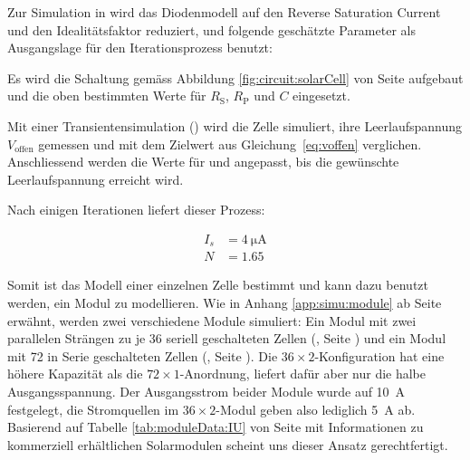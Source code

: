 
Zur  Simulation  in    wird das  Diodenmodell  auf  den  Reverse
Saturation  Current   und  den  Idealit\"atsfaktor  reduziert,   und  folgende
gesch\"atzte Parameter als Ausgangslage f\"ur den Iterationsprozess benutzt:

\begin{center}
\end{center}

Es wird die Schaltung gem\"ass Abbildung \ref{fig:circuit:solarCell} von Seite
\pageref{fig:circuit:solarCell} aufgebaut und die  oben bestimmten Werte f\"ur
$R_{\mathrm{S}}$, $R_{\mathrm{P}}$ und $C$ eingesetzt.

Mit einer  Transientensimulation () wird die  Zelle simuliert,
ihre  Leerlaufspannung  $V_{\mathrm{offen}}$  gemessen und  mit  dem  Zielwert
aus   Gleichung~\ref{eq:voffen}  verglichen.  Anschliessend  werden die  Werte f\"ur   und 
angepasst, bis die gew\"unschte Leerlaufspannung erreicht wird.

Nach einigen Iterationen liefert dieser Prozess\footnotemark:


\begin{align}
    \label{eq:cell:diode:IS:N:result}
    I_s &= \SI{4}{\micro\ampere} \\
    N   &= 1.65
\end{align}

Somit ist  das Modell  einer einzelnen  Zelle bestimmt  und kann  dazu benutzt
werden,  ein   Modul  zu  modellieren. Wie  in   Anhang  \ref{app:simu:module}
ab  Seite   \pageref{app:simu:module}  erw\"ahnt,  werden   zwei  verschiedene
Module   simuliert: Ein   Modul  mit   zwei   parallelen   Str\"angen  zu   je
36  seriell   geschalteten  Zellen  (,
Seite  \pageref{fig:ltspice:module:cellBased:36x2})  und   ein  Modul  mit  72
in   Serie   geschalteten  Zellen   (,
Seite     \pageref{fig:ltspice:module:cellBased:72x1}). Die     $36     \times
2$-Konfiguration   hat   eine  h\"ohere   Kapazit\"at   als
die   $72  \times   1$-Anordnung,   liefert  daf\"ur   aber   nur  die   halbe
Ausgangsspannung. Der Ausgangsstrom  beider Module wurde  auf \SI{10}{\ampere}
festgelegt,  die Stromquellen  im  $36 \times  2$-Modul  geben also  lediglich
\SI{5}{\ampere}  ab. Basierend auf  Tabelle \ref{tab:moduleData:IU}  von Seite
\pageref{tab:moduleData:IU}  mit Informationen  zu kommerziell  erh\"altlichen
Solarmodulen scheint uns dieser Ansatz gerechtfertigt.

